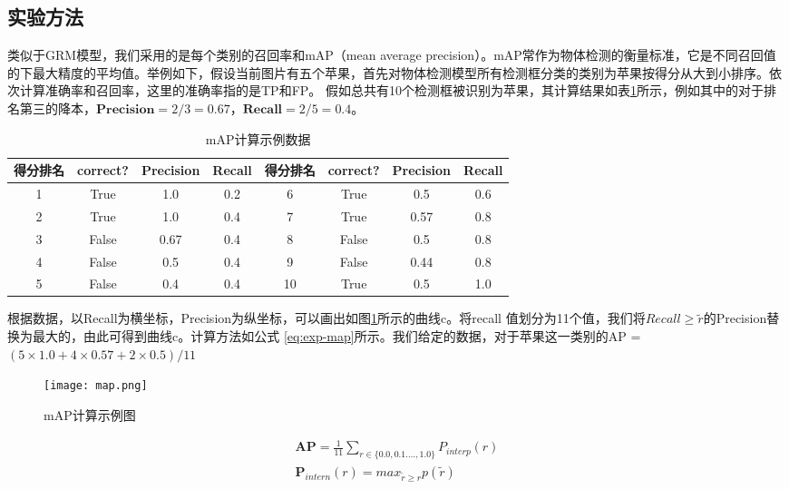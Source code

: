 \subsection{实验方法}
类似于GRM模型，我们采用的是每个类别的召回率和mAP（mean average precision）。mAP常作为物体检测的衡量标准，它是不同召回值的下最大精度的平均值。举例如下，假设当前图片有五个苹果，首先对物体检测模型所有检测框分类的类别为苹果按得分从大到小排序。依次计算准确率和召回率，这里的准确率指的是TP和FP。 假如总共有10个检测框被识别为苹果，其计算结果如表\ref{tab:exp-map}所示，例如其中的对于排名第三的降本，$\textbf{Precision} = 2/3 = 0.67$，$\textbf{Recall} = 2/5 = 0.4$。
\begin{table}[htpb]
  \centering
  \caption{mAP计算示例数据}
  \label{tab:exp-map}
  \begin{tabular}{c|c|c|c|c|c|c|c}
    \toprule
    \textbf{得分排名} & \textbf{correct?} & \textbf{Precision} & \textbf{Recall}  & \textbf{得分排名} & \textbf{correct?} & \textbf{Precision} & \textbf{Recall}   \\
    \midrule
    1 & True & 1.0 & 0.2  & 6 & True & 0.5 & 0.6    \\
    \midrule
    2 &  True & 1.0 & 0.4  & 7 & True & 0.57 & 0.8  \\
    \midrule
    3 & False & 0.67 & 0.4  & 8 & False & 0.5 & 0.8  \\
    \midrule
    4 & False & 0.5 & 0.4   & 9 & False & 0.44 & 0.8 \\
    \midrule
    5 & False & 0.4 & 0.4  & 10 & True & 0.5 & 1.0 \\
    \bottomrule
  \end{tabular}
\end{table}
根据数据，以Recall为横坐标，Precision为纵坐标，可以画出如图\ref{fig:exp-map}所示的曲线c。将recall 值划分为11个值，我们将$Recall \geq \widetilde{r}$的Precision替换为最大的，由此可得到曲线c。计算方法如公式
\ref{eq:exp-map}所示。我们给定的数据，对于苹果这一类别的AP = $(5 \times 1.0 + 4 \times 0.57 + 2 \times 0.5)/11$
\begin{figure}[htpb]
	\centering
	\texttt{[image: map.png]}
    \caption{mAP计算示例图}
	\vspace*{-3.5mm}
	\label{fig:exp-map}
\end{figure}
\begin{equation} \label{eq:exp-map}
\begin{split}
    \mathbf{AP} = \frac{1}{11}\sum_{r \in \{0.0,0.1....,1.0\}}P_{interp}(r) \\
    \mathbf{P}_{intern}(r) = max_{\widetilde{r} \geq r}p(\widetilde{r})
\end{split}
\end{equation}

